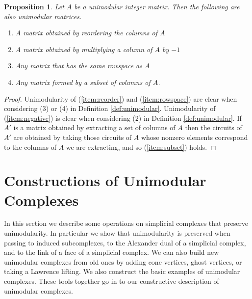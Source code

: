 \documentclass[letterpaper,12pt]{amsart}
\theoremstyle{plain}
\newtheorem{prop}[thm]{Proposition}
\theoremstyle{definition}
\theoremstyle{remark}
\newcommand{\bfd}{\mathbf{d}}
\newcommand{\calc}{\mathcal{C}}
\begin{document}
 \begin{prop}\label{obvious}
 	Let $A$ be a unimodular integer matrix.
 	Then the following are also unimodular matrices.
	\begin{enumerate}
		\item\label{item:reorder} A matrix obtained by reordering the columns of $A$
		\item\label{item:negative} A matrix obtained by multiplying a column of $A$ by $-1$
		\item\label{item:rowspace} Any matrix that has the same rowspace as $A$
		\item\label{item:subset} Any matrix formed by a subset of columns of $A$.
	\end{enumerate}
 \end{prop}
 \begin{proof}
 	Unimodularity of (\ref{item:reorder}) and (\ref{item:rowspace}) are clear when considering (3) or (4) in Definition \ref{def:unimodular}.
	Unimodularity of (\ref{item:negative}) is clear when considering (2) in Definition \ref{def:unimodular}.
	If $A'$ is a matrix obtained by extracting a set of columns of $A$
	then the circuits of $A'$ are obtained by taking those circuits
	of $A$ whose nonzero elements correspond to the columns of $A$ we are extracting,
	and so (\ref{item:subset}) holds. 
 \end{proof}
 
\begin{comment}
For instance, if $F$ is a facet of $\calc$ and $F' \subseteq F$, then
adding a block of rows corresponding to the face $F'$ of $\calc$ does
not change the row space of $\mathcal{A}_{\calc, \bfd}$.  This is because the $F'$-marginal
can be computed directed from the $F$-marginal, so it does not
provide any new information.
\end{comment}







\section{Constructions of Unimodular Complexes}\label{sec:basic}



In this section we describe some operations on simplicial complexes 
that preserve unimodularity.
In particular we show that unimodularity is preserved when 
passing to induced subcomplexes, to the Alexander dual of a simplicial complex,
and to the link of a face of a simplicial complex.  We can also
build new unimodular complexes from old ones by adding cone vertices,
ghost vertices, or taking a Lawrence lifting.
We also construct the basic examples of unimodular complexes.
These tools together go in to our constructive description of 
unimodular complexes.
\end{document}
